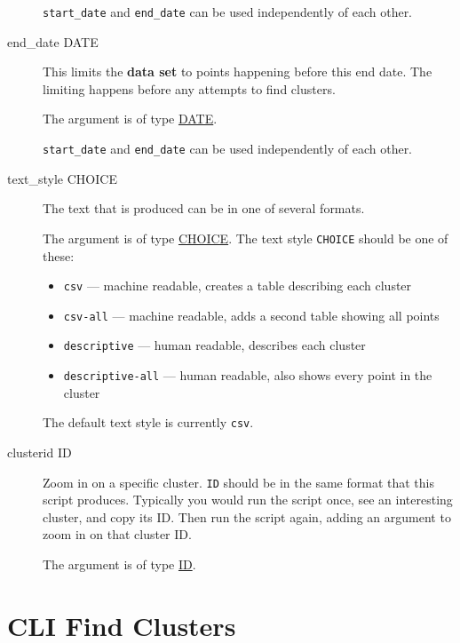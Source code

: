 \begin{description}
\verb=start_date= and \verb=end_date= can be used independently of
each other.

\item[end\_date DATE]
\hypertarget{cluster-end-date}{}

This limits the \textbf{data set} to points happening before this end
date. The limiting happens before any attempts to find clusters.

The argument is of type \hyperlink{argument-type-date}{DATE}.

\verb=start_date= and \verb=end_date= can be used independently of
each other.

\item[text\_style CHOICE]
\hypertarget{cluster-text-style}{}

The text that is produced can be in one of several formats.

The argument is of type \hyperlink{argument-type-choice}{CHOICE}. The text
style \verb=CHOICE= should be one of these:

\begin{itemize}
\item \verb=csv= --- machine readable, creates a table describing each cluster
\item \verb=csv-all= --- machine readable, adds a second table showing all points
\item \verb=descriptive= --- human readable, describes each cluster
\item \verb=descriptive-all= --- human readable, also shows every point in the cluster
\end{itemize}

The default text style is currently \verb=csv=.

\item[clusterid ID]
\hypertarget{cluster-clusterid}{}

Zoom in on a specific cluster. \verb=ID= should be in the same format
that this script produces. Typically you would run the script once,
see an interesting cluster, and copy its ID. Then run the script
again, adding an argument to zoom in on that cluster ID.

The argument is of type \hyperlink{argument-type-id}{ID}.


\end{description}


\section{CLI Find Clusters}

